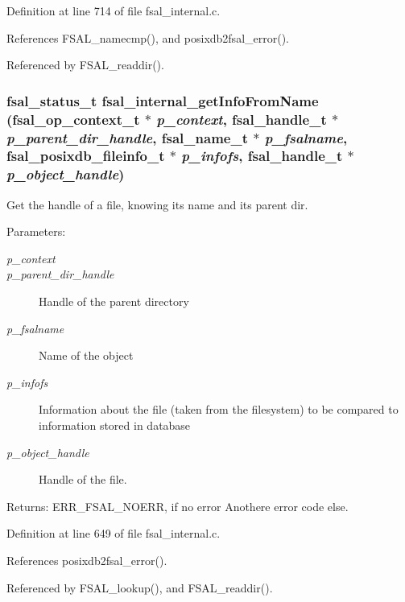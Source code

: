 Definition at line 714 of file fsal\_\-internal.c.

References FSAL\_\-namecmp(), and posixdb2fsal\_\-error().

Referenced by FSAL\_\-readdir().
\subsubsection[{fsal\_\-internal\_\-getInfoFromName}]{\setlength{\rightskip}{0pt plus 5cm}fsal\_\-status\_\-t fsal\_\-internal\_\-getInfoFromName (fsal\_\-op\_\-context\_\-t $\ast$ {\em p\_\-context}, \/  fsal\_\-handle\_\-t $\ast$ {\em p\_\-parent\_\-dir\_\-handle}, \/  fsal\_\-name\_\-t $\ast$ {\em p\_\-fsalname}, \/  fsal\_\-posixdb\_\-fileinfo\_\-t $\ast$ {\em p\_\-infofs}, \/  fsal\_\-handle\_\-t $\ast$ {\em p\_\-object\_\-handle})}\label{fsal__internal_8c_b064a9294bc363c40dc91bf096b34dca}


Get the handle of a file, knowing its name and its parent dir. 

\begin{Desc}
\item[Parameters:]
\begin{description}
\item[{\em p\_\-context}]\item[{\em p\_\-parent\_\-dir\_\-handle}]Handle of the parent directory \item[{\em p\_\-fsalname}]Name of the object \item[{\em p\_\-infofs}]Information about the file (taken from the filesystem) to be compared to information stored in database \item[{\em p\_\-object\_\-handle}]Handle of the file.\end{description}
\end{Desc}
\begin{Desc}
\item[Returns:]ERR\_\-FSAL\_\-NOERR, if no error Anothere error code else. \end{Desc}


Definition at line 649 of file fsal\_\-internal.c.

References posixdb2fsal\_\-error().

Referenced by FSAL\_\-lookup(), and FSAL\_\-readdir().
